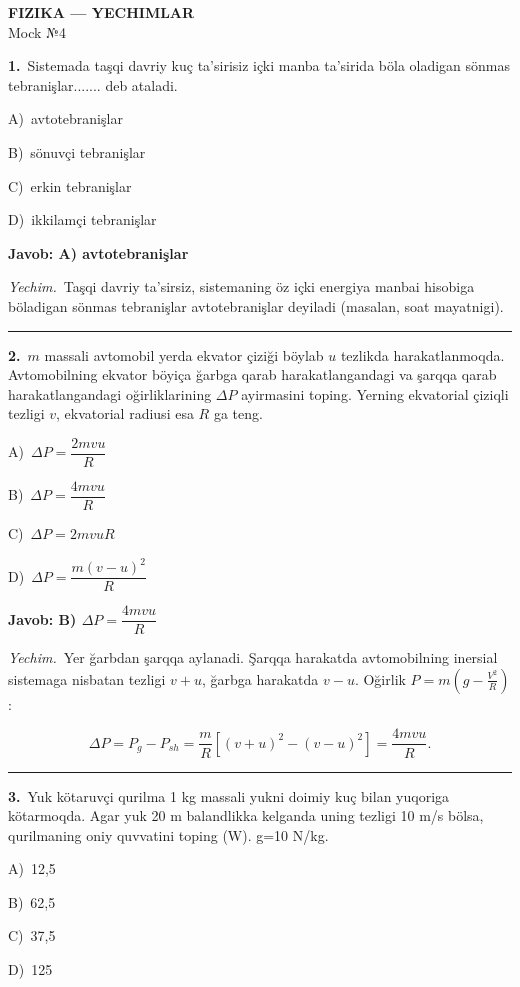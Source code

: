 \documentclass[11pt,a4paper]{article}
\newcommand{\opt}[2]{\hspace*{4mm}#1)\ #2\par}
\begin{document}
\begin{center}{\Large\textbf{FIZIKA — YECHIMLAR}}\\[2pt]{\large Mock №4}\end{center}
\noindent\begin{minipage}{\linewidth}
\textbf{1.}\ Sistemada taşqi davriy kuç ta’sirisiz içki manba ta’sirida böla oladigan sönmas tebranişlar....... deb ataladi.\par\smallskip
\opt{A}{avtotebranişlar}
\opt{B}{sönuvçi tebranişlar}
\opt{C}{erkin tebranişlar}
\opt{D}{ikkilamçi tebranişlar}
\end{minipage}\vspace{2pt}\par
\noindent\colorbox{gray!12}{\parbox{\dimexpr\linewidth-2\fboxsep}{\textbf{Javob: A) avtotebranişlar}}}\par\smallskip
\noindent\textit{Yechim.}\ Taşqi davriy ta’sirsiz, sistemaning öz içki energiya manbai hisobiga böladigan sönmas tebranişlar avtotebranişlar deyiladi (masalan, soat mayatnigi).\par\par\medskip\hrule\medskip
{}\noindent\begin{minipage}{\linewidth}
\textbf{2.}\ $m$ massali avtomobil yerda ekvator çiziği böylab $u$ tezlikda harakatlanmoqda. Avtomobilning ekvator böyiça ğarbga qarab harakatlangandagi va şarqqa qarab harakatlangandagi oğirliklarining $\Delta P$ ayirmasini toping. Yerning ekvatorial çiziqli tezligi $v$, ekvatorial radiusi esa $R$ ga teng.\par\smallskip
\opt{A}{$\Delta P=\dfrac{2mvu}{R}$}
\opt{B}{$\Delta P=\dfrac{4mvu}{R}$}
\opt{C}{$\Delta P=2mvuR$}
\opt{D}{$\Delta P=\dfrac{m(v-u)^2}{R}$}
\end{minipage}\vspace{2pt}\par
\noindent\colorbox{gray!12}{\parbox{\dimexpr\linewidth-2\fboxsep}{\textbf{Javob: B) $\Delta P=\dfrac{4mvu}{R}$}}}\par\smallskip
\noindent\textit{Yechim.}\ Yer ğarbdan şarqqa aylanadi. Şarqqa harakatda avtomobilning inersial sistemaga nisbatan tezligi $v+u$, ğarbga harakatda $v-u$. Oğirlik $P=m\left(g-\frac{V^2}{R}\right)$:\par
\[\Delta P=P_{g}-P_{sh}=\frac{m}{R}\left[(v+u)^2-(v-u)^2\right]=\frac{4mvu}{R}.\]\par\medskip\hrule\medskip
{}\noindent\begin{minipage}{\linewidth}
\textbf{3.}\ Yuk kötaruvçi qurilma 1 kg massali yukni doimiy kuç bilan yuqoriga kötarmoqda. Agar yuk 20 m balandlikka kelganda uning tezligi 10 m/s bölsa, qurilmaning oniy quvvatini toping (W). g=10 N/kg.\par\smallskip
\opt{A}{12,5}
\opt{B}{62,5}
\opt{C}{37,5}
\opt{D}{125}
\end{minipage}\vspace{2pt}\par
\end{document}
